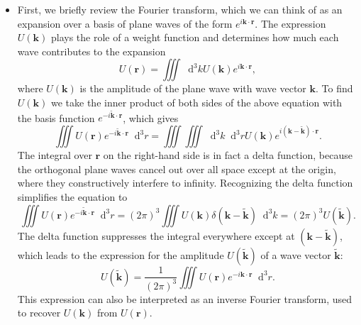 \documentclass[11pt, a4paper]{article}
\newcommand{\diff}{\mathop{}\!\mathrm{d}} %
\renewcommand{\vec}[1]{\bm{#1}} %
\newcommand{\tvec}[1]{\tilde{\vec{#1}}} %
\renewcommand{\r}{\vec{r}}
\begin{document}
\begin{itemize}
	\item First, we briefly review the Fourier transform, which we can think of as an expansion over a basis of plane waves of the form $ e^{i \vec{k} \cdot \r} $. The expression $ U(\vec{k}) $ plays the role of a weight function and determines how much each wave contributes to the expansion
	\begin{equation*}
		U(\r) = \iiint \diff^{3}k U(\vec{k}) e^{i \vec{k}\cdot \r},
	\end{equation*}
	where $ U(\vec{k}) $ is the amplitude of the plane wave with wave vector $ \vec{k} $. To find $ U(\vec{k}) $ we take the inner product of both sides of the above equation with the basis function $ e^{-i \tvec{k}\cdot\r} $, which gives 
	\begin{equation*}
		\iiint U(\r) e^{-i \tvec{k}\cdot \r} \diff^{3}r = \iiint \iiint \diff^{3}k \diff^{3}r U(\vec{k}) e^{i (\vec{k} - \tvec{k})\cdot \r}.
	\end{equation*}
	The integral over $ \r $ on the right-hand side is in fact a delta function, because the orthogonal plane waves cancel out over all space except at the origin, where they constructively interfere to infinity. Recognizing the delta function simplifies the equation to
	\begin{equation*}
		\iiint U(\r) e^{-i \tvec{k}\cdot \r} \diff^{3}r = (2\pi)^{3} \iiint U(\vec{k}) \delta (\vec{k} - \tvec{k}) \diff^{3}k = (2\pi)^{3} U(\tvec{k}).
	\end{equation*}
	The delta function suppresses the integral everywhere except at $ (\vec{k} - \tvec{k}) $, which leads to the expression for the amplitude $ U(\tvec{k}) $ of a wave vector $ \tvec{k} $:
	\begin{equation*}
		U(\tvec{k}) = \frac{1}{(2\pi)^{3}} \iiint U(\r) e^{-i\vec{k}\cdot \r} \diff^{3}r.
	\end{equation*}
	This expression can also be interpreted as an inverse Fourier transform, used to recover $ U(\vec{k}) $ from $ U(\r) $.


\end{itemize}
\end{document}
